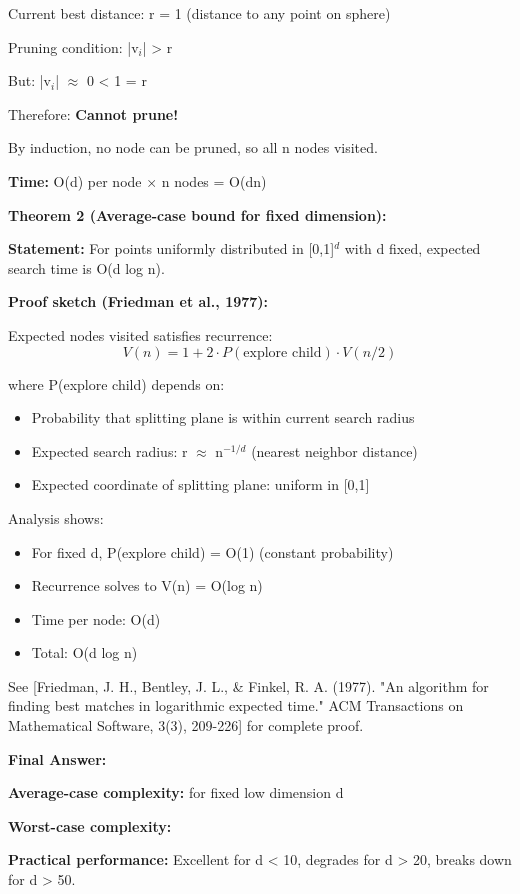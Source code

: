 \documentclass[12pt]{article}
\begin{document}
\begin{solution}
Current best distance: r = 1 (distance to any point on sphere)

Pruning condition: |v$_i$| > r

But: |v$_i$| $\approx$ 0 < 1 = r

Therefore: \textbf{Cannot prune!}

By induction, no node can be pruned, so all n nodes visited. \quad \checkmark

\textbf{Time:} O(d) per node × n nodes = O(dn) \quad \boxed{\checkmark}

\textbf{Theorem 2 (Average-case bound for fixed dimension):}

\textbf{Statement:} For points uniformly distributed in [0,1]$^d$ with d fixed, expected search time is O(d log n).

\textbf{Proof sketch (Friedman et al., 1977):}

Expected nodes visited satisfies recurrence:
\[
V(n) = 1 + 2 \cdot P(\text{explore child}) \cdot V(n/2)
\]

where P(explore child) depends on:
\begin{itemize}
    \item Probability that splitting plane is within current search radius
    \item Expected search radius: r $\approx$ n$^{-1/d}$ (nearest neighbor distance)
    \item Expected coordinate of splitting plane: uniform in [0,1]
\end{itemize}

Analysis shows:
\begin{itemize}
    \item For fixed d, P(explore child) = O(1) (constant probability)
    \item Recurrence solves to V(n) = O(log n)
    \item Time per node: O(d)
    \item Total: O(d log n)
\end{itemize}

See [Friedman, J. H., Bentley, J. L., & Finkel, R. A. (1977). "An algorithm for finding best matches in logarithmic expected time." ACM Transactions on Mathematical Software, 3(3), 209-226] for complete proof. \quad \boxed{\checkmark}

\textbf{Final Answer:}

\textbf{Average-case complexity:}  for fixed low dimension d

\textbf{Worst-case complexity:} 

\textbf{Practical performance:} Excellent for d < 10, degrades for d > 20, breaks down for d > 50.
\end{solution}
\end{document}
